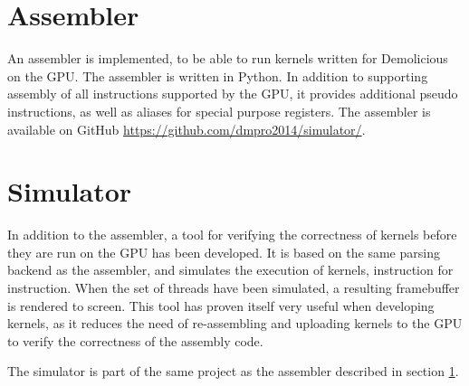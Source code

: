 \section{Assembler}
\label{sec:assembler}

An assembler is implemented, to be able to run kernels written for Demolicious on the GPU.
The assembler is written in Python.
In addition to supporting assembly of all instructions supported by the GPU,
it provides additional pseudo instructions, as well as aliases for special purpose registers.
The assembler is available on GitHub \url{https://github.com/dmpro2014/simulator/}.

\section{Simulator}
\label{sec:simulator}

In addition to the assembler,
a tool for verifying the correctness of kernels before they are run on the GPU has been developed.
It is based on the same parsing backend as the assembler, and simulates the execution of kernels, instruction for instruction.
When the set of threads have been simulated, a resulting framebuffer is rendered to screen.
This tool has proven itself very useful when developing kernels,
as it reduces the need of re-assembling and uploading kernels to the GPU to verify the correctness of the assembly code.

The simulator is part of the same project as the assembler described in section \ref{sec:assembler}.
